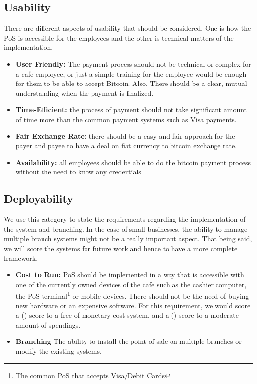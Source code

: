 \subsection{Usability} There are different aspects of usability that should be considered. One is how the PoS is accessible for the employees and the other is technical matters of the implementation.
\begin{itemize}

\item \textbf{User Friendly: }The payment process should not be technical or complex for a cafe employee, or just a simple training for the employee would be enough for them to be able to accept Bitcoin. Also, There should be a clear, mutual understanding when the payment is finalized.

\item \textbf{Time-Efficient: }the process of payment should not take significant amount of time more than the common payment systems such as Visa payments.

\item \textbf{Fair Exchange Rate: }there should be a easy and fair approach for the payer and payee to have a deal on fiat currency to bitcoin exchange rate.

\item \textbf{Availability: }all employees should be able to do the bitcoin payment process without the need to know any credentials

\end{itemize}
\subsection{Deployability} We use this category to state the requirements regarding the implementation of the system and branching. In the case of small businesses, the ability to manage multiple branch systems might not be a really important aspect. That being said, we will score the systems for future work and hence to have a more complete framework.
\begin{itemize}

\item \textbf{Cost to Run: }PoS should be implemented in a way that is accessible with one of the currently owned devices of the cafe such as the cashier computer, the PoS terminal\footnote{The common PoS that accepts Visa/Debit Cards} or mobile devices. There should not be the need of buying new hardware or an expensive software. For this requirement, we would score a (\full) score to a free of monetary cost system, and a (\prt) score to a moderate amount of spendings.

\item \textbf{Branching} The ability to install the point of sale on multiple branches or modify the existing systems.

\end{itemize}
 
